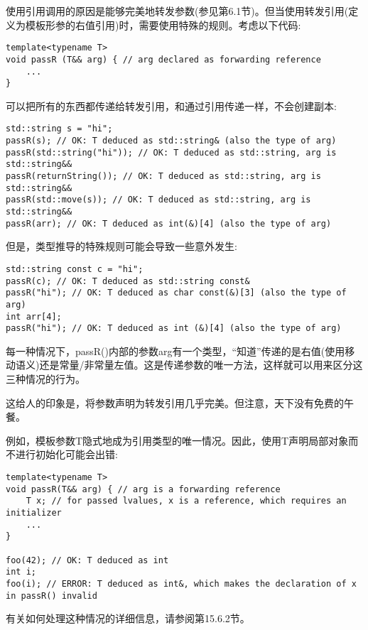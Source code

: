 
使用引用调用的原因是能够完美地转发参数(参见第6.1节)。但当使用转发引用(定义为模板形参的右值引用)时，需要使用特殊的规则。考虑以下代码:

\begin{lstlisting}[style=styleCXX]
template<typename T>
void passR (T&& arg) { // arg declared as forwarding reference
	...
}
\end{lstlisting}

可以把所有的东西都传递给转发引用，和通过引用传递一样，不会创建副本:

\begin{lstlisting}[style=styleCXX]
std::string s = "hi";
passR(s); // OK: T deduced as std::string& (also the type of arg)
passR(std::string("hi")); // OK: T deduced as std::string, arg is std::string&&
passR(returnString()); // OK: T deduced as std::string, arg is std::string&&
passR(std::move(s)); // OK: T deduced as std::string, arg is std::string&&
passR(arr); // OK: T deduced as int(&)[4] (also the type of arg)
\end{lstlisting}

但是，类型推导的特殊规则可能会导致一些意外发生:

\begin{lstlisting}[style=styleCXX]
std::string const c = "hi";
passR(c); // OK: T deduced as std::string const&
passR("hi"); // OK: T deduced as char const(&)[3] (also the type of arg)
int arr[4];
passR("hi"); // OK: T deduced as int (&)[4] (also the type of arg)
\end{lstlisting}

每一种情况下，passR()内部的参数arg有一个类型，“知道”传递的是右值(使用移动语义)还是常量/非常量左值。这是传递参数的唯一方法，这样就可以用来区分这三种情况的行为。

这给人的印象是，将参数声明为转发引用几乎完美。但注意，天下没有免费的午餐。

例如，模板参数T隐式地成为引用类型的唯一情况。因此，使用T声明局部对象而不进行初始化可能会出错:

\begin{lstlisting}[style=styleCXX]
template<typename T>
void passR(T&& arg) { // arg is a forwarding reference
	T x; // for passed lvalues, x is a reference, which requires an initializer
	...
}

foo(42); // OK: T deduced as int
int i;
foo(i); // ERROR: T deduced as int&, which makes the declaration of x in passR() invalid
\end{lstlisting}

有关如何处理这种情况的详细信息，请参阅第15.6.2节。




















